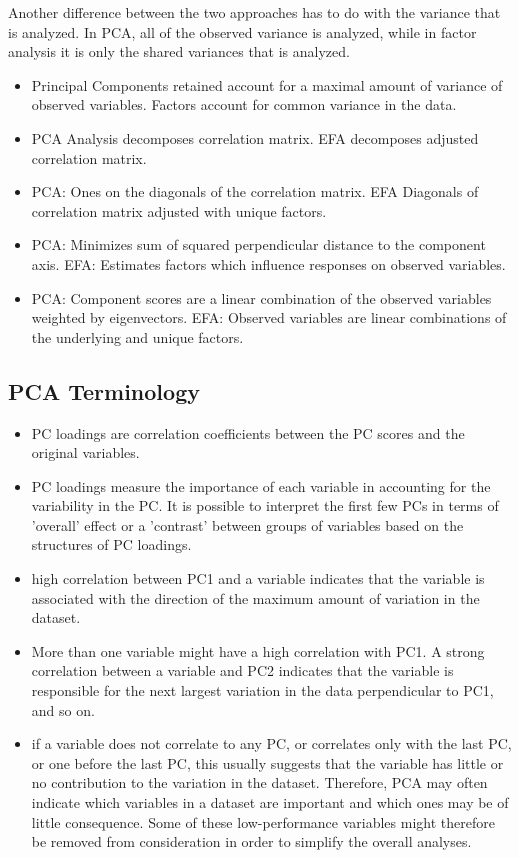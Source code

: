 \documentclass[a4paper,12pt]{article}
\begin{document}
Another difference between the two approaches has to do with the variance that is analyzed. In PCA, all of the observed variance is analyzed, while in factor analysis it is only the shared variances that is analyzed.
\begin{itemize}
\item Principal Components retained account for a maximal amount of variance of observed variables.
Factors account for common variance in the data.

\item PCA Analysis decomposes correlation matrix. EFA  decomposes adjusted correlation matrix.

\item PCA: Ones on the diagonals of the correlation matrix. EFA Diagonals of correlation matrix adjusted with unique factors.

\item PCA: Minimizes sum of squared perpendicular distance to
the component axis. EFA: Estimates factors which influence responses on
observed variables.
\item PCA: Component scores are a linear combination of the
observed variables weighted by eigenvectors.
EFA: Observed variables are linear combinations of the
underlying and unique factors.
\end{itemize}


\newpage

\subsection{PCA Terminology}
\begin{itemize}
\item  PC loadings are correlation coefficients between the PC scores and the
original variables.
\item  PC loadings measure the importance of each variable in accounting for the
variability in the PC.  It is possible to interpret the first few PCs in terms of
'overall' effect or a 'contrast' between groups of variables based on the
structures of PC loadings.
\item high correlation between PC1 and a variable indicates that the variable is
associated with the direction of the maximum amount of variation in the
dataset.
\item More than one variable might have a high correlation with PC1. A strong
correlation between a variable and PC2 indicates that the variable is
responsible for the next largest variation in the data perpendicular to PC1,
and so on.
\item  if a variable does not correlate to any PC, or correlates only with the last PC,
or one before the last PC, this usually suggests that the variable has little or
no contribution to the variation in the dataset. Therefore, PCA may often
indicate which variables in a dataset are important and which ones may be of
little consequence. Some of these low-performance variables might
therefore be removed from consideration in order to simplify the overall
analyses.
\end{itemize}
\end{document}
